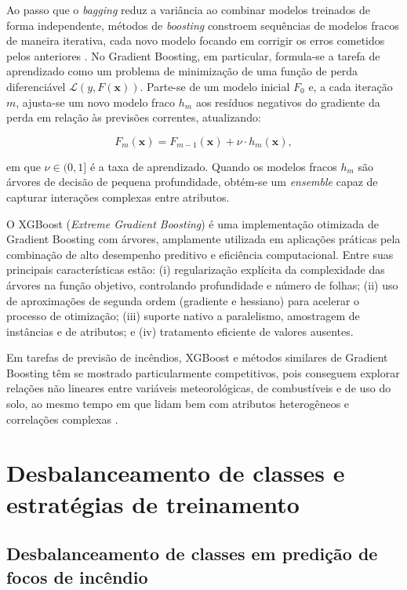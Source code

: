Ao passo que o \textit{bagging} reduz a variância ao combinar modelos treinados de forma independente, métodos de \textit{boosting} constroem sequências de modelos fracos de maneira iterativa, cada novo modelo focando em corrigir os erros cometidos pelos anteriores \cite{friedman2001greedy}. No Gradient Boosting, em particular, formula-se a tarefa de aprendizado como um problema de minimização de uma função de perda diferenciável $\mathcal{L}(y, F(\mathbf{x}))$. Parte-se de um modelo inicial $F_0$ e, a cada iteração $m$, ajusta-se um novo modelo fraco $h_m$ aos resíduos negativos do gradiente da perda em relação às previsões correntes, atualizando:

\begin{equation}
F_m(\mathbf{x}) = F_{m-1}(\mathbf{x}) + \nu \cdot h_m(\mathbf{x}),
\end{equation}

em que $\nu \in (0,1]$ é a taxa de aprendizado. Quando os modelos fracos $h_m$ são árvores de decisão de pequena profundidade, obtém-se um \textit{ensemble} capaz de capturar interações complexas entre atributos.

O XGBoost (\emph{Extreme Gradient Boosting}) \cite{chen2016xgboost} é uma implementação otimizada de Gradient Boosting com árvores, amplamente utilizada em aplicações práticas pela combinação de alto desempenho preditivo e eficiência computacional. Entre suas principais características estão: (i) regularização explícita da complexidade das árvores na função objetivo, controlando profundidade e número de folhas; (ii) uso de aproximações de segunda ordem (gradiente e hessiano) para acelerar o processo de otimização; (iii) suporte nativo a paralelismo, amostragem de instâncias e de atributos; e (iv) tratamento eficiente de valores ausentes.

Em tarefas de previsão de incêndios, XGBoost e métodos similares de Gradient Boosting têm se mostrado particularmente competitivos, pois conseguem explorar relações não lineares entre variáveis meteorológicas, de combustíveis e de uso do solo, ao mesmo tempo em que lidam bem com atributos heterogêneos e correlações complexas \cite{andrianarivony2024review}.

\section{Desbalanceamento de classes e estratégias de treinamento}
\label{sec:desbalanceamento_treinamento}

\subsection{Desbalanceamento de classes em predição de focos de incêndio}

